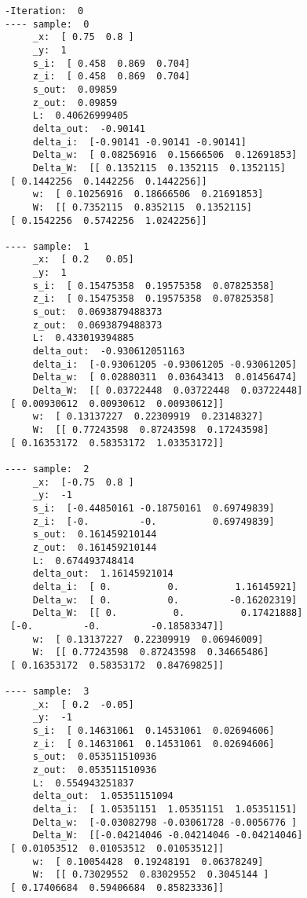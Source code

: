 \documentclass[10pt]{article}
\begin{document}
\begin{multicols}{3}
\begin{tiny}
\begin{verbatim}
-Iteration:  0
---- sample:  0
     _x:  [ 0.75  0.8 ]
     _y:  1
     s_i:  [ 0.458  0.869  0.704]
     z_i:  [ 0.458  0.869  0.704]
     s_out:  0.09859
     z_out:  0.09859
     L:  0.40626999405
     delta_out:  -0.90141
     delta_i:  [-0.90141 -0.90141 -0.90141]
     Delta_w:  [ 0.08256916  0.15666506  0.12691853]
     Delta_W:  [[ 0.1352115  0.1352115  0.1352115]
 [ 0.1442256  0.1442256  0.1442256]]
     w:  [ 0.10256916  0.18666506  0.21691853]
     W:  [[ 0.7352115  0.8352115  0.1352115]
 [ 0.1542256  0.5742256  1.0242256]]

---- sample:  1
     _x:  [ 0.2   0.05]
     _y:  1
     s_i:  [ 0.15475358  0.19575358  0.07825358]
     z_i:  [ 0.15475358  0.19575358  0.07825358]
     s_out:  0.0693879488373
     z_out:  0.0693879488373
     L:  0.433019394885
     delta_out:  -0.930612051163
     delta_i:  [-0.93061205 -0.93061205 -0.93061205]
     Delta_w:  [ 0.02880311  0.03643413  0.01456474]
     Delta_W:  [[ 0.03722448  0.03722448  0.03722448]
 [ 0.00930612  0.00930612  0.00930612]]
     w:  [ 0.13137227  0.22309919  0.23148327]
     W:  [[ 0.77243598  0.87243598  0.17243598]
 [ 0.16353172  0.58353172  1.03353172]]

---- sample:  2
     _x:  [-0.75  0.8 ]
     _y:  -1
     s_i:  [-0.44850161 -0.18750161  0.69749839]
     z_i:  [-0.         -0.          0.69749839]
     s_out:  0.161459210144
     z_out:  0.161459210144
     L:  0.674493748414
     delta_out:  1.16145921014
     delta_i:  [ 0.          0.          1.16145921]
     Delta_w:  [ 0.          0.         -0.16202319]
     Delta_W:  [[ 0.          0.          0.17421888]
 [-0.         -0.         -0.18583347]]
     w:  [ 0.13137227  0.22309919  0.06946009]
     W:  [[ 0.77243598  0.87243598  0.34665486]
 [ 0.16353172  0.58353172  0.84769825]]

---- sample:  3
     _x:  [ 0.2  -0.05]
     _y:  -1
     s_i:  [ 0.14631061  0.14531061  0.02694606]
     z_i:  [ 0.14631061  0.14531061  0.02694606]
     s_out:  0.053511510936
     z_out:  0.053511510936
     L:  0.554943251837
     delta_out:  1.05351151094
     delta_i:  [ 1.05351151  1.05351151  1.05351151]
     Delta_w:  [-0.03082798 -0.03061728 -0.0056776 ]
     Delta_W:  [[-0.04214046 -0.04214046 -0.04214046]
 [ 0.01053512  0.01053512  0.01053512]]
     w:  [ 0.10054428  0.19248191  0.06378249]
     W:  [[ 0.73029552  0.83029552  0.3045144 ]
 [ 0.17406684  0.59406684  0.85823336]]


\end{verbatim}
\end{tiny}
\end{multicols}
\end{document}
